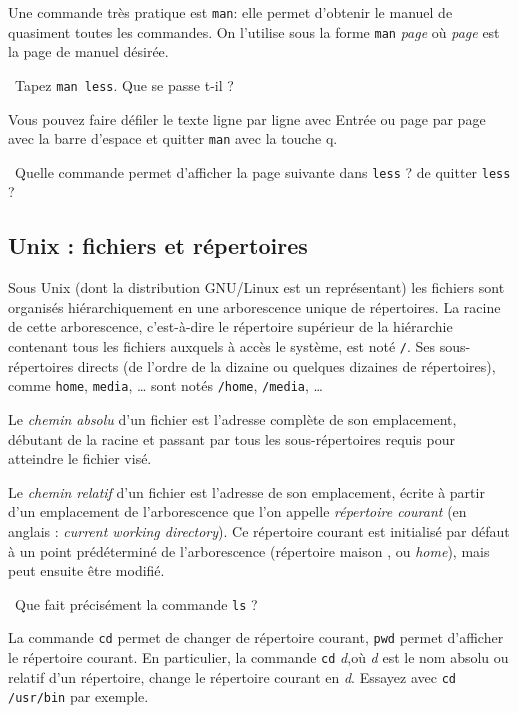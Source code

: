 Une commande très pratique est \texttt{man}: elle permet d'obtenir le
manuel de quasiment toutes les commandes. On l'utilise sous la
forme \texttt{man} \textit{page} où \textit{page} est la page de
manuel désirée.

\medskip

\question\ Tapez \texttt{man less}. Que se passe t-il ?

\medskip

Vous pouvez faire défiler le texte ligne par ligne avec Entrée ou page
par page avec la barre d'espace et quitter \texttt{man} avec la touche
q.

\medskip

\question\ Quelle commande permet d'afficher la page suivante dans \texttt{less} ? de quitter \texttt{less} ? 



\subsection{Unix : fichiers et répertoires} \label{tp02:sec:unix2}

Sous Unix (dont la distribution GNU/Linux est un représentant) les
fichiers sont organisés hiérarchiquement en une arborescence unique de
répertoires. La racine de cette arborescence, c'est-à-dire le
répertoire supérieur de la hiérarchie contenant tous les fichiers
auxquels à accès le système, est noté \texttt{/}. Ses sous-répertoires
directs (de l'ordre de la dizaine ou quelques dizaines de
répertoires), comme \texttt{home}, \texttt{media}, \ldots{}
sont notés \texttt{/home}, \texttt{/media}, \ldots

Le \emph{chemin absolu} d'un fichier est l'adresse complète de son emplacement,
débutant de la racine et passant par tous les sous-répertoires requis pour
atteindre le fichier visé.

Le \emph{chemin relatif} d'un fichier est l'adresse de son emplacement, écrite à partir d'un emplacement de l'arborescence que l'on appelle \emph{répertoire courant} (en anglais : \emph{current working directory}). 
Ce répertoire courant est initialisé par défaut à un point prédéterminé de l'arborescence (répertoire \og maison \fg, ou \emph{home}), mais peut ensuite être modifié.

\medskip

\question\ Que fait précisément la commande \texttt{ls} ?

\medskip

La commande \texttt{cd} permet de changer de répertoire
courant, \texttt{pwd} permet d'afficher le répertoire courant. En
particulier, la commande \texttt{cd} \textit{d},où \textit{d} est le nom absolu ou relatif
d'un répertoire, change le répertoire courant en
\textit{d}. Essayez avec \texttt{cd /usr/bin} par exemple.

